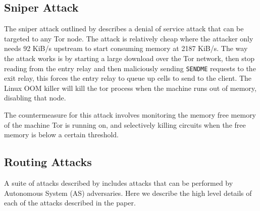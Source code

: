 \documentclass[9pt,technote]{IEEEtran}
\begin{document}
\subsection{Sniper Attack}
The sniper attack outlined by \citeauthor{jansen2014sniper} describes a denial
of service attack that can be targeted to any Tor node. The attack is relatively
cheap where the attacker only needs 92 KiB/s upstream to start consuming memory
at 2187 KiB/s. The way the attack works is by starting a large download over the
Tor network, then stop reading from the entry relay and then maliciously sending
\texttt{SENDME} requests to the exit relay, this forces the entry relay to queue
up cells to send to the client. The Linux OOM killer will kill the tor process
when the machine runs out of memory, disabling that node.

The countermeasure for this attack involves monitoring the memory free memory of
the machine Tor is running on, and selectively killing circuits when the free
memory is below a certain threshold.

\subsection{Routing Attacks}
A suite of attacks described by \citeauthor{sun2015raptor} includes attacks that
can be performed by Autonomous System (AS) adversaries. Here we describe the
high level details of each of the attacks described in the paper.
\end{document}
